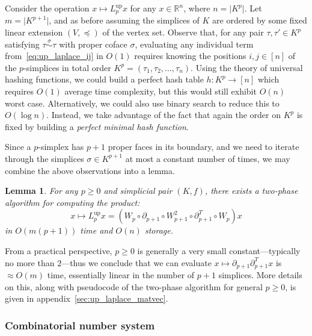 \documentclass[10pt]{article}
\numberwithin{equation}{section}
\newcommand{\+}{%
	\raisebox{0.18ex}{\scaleobj{0.55}{+}}
}
\newtheorem{lemma}{Lemma}
\theoremstyle{definition}
\begin{document}
Consider the operation $x \mapsto L_p^{\text{up}} x$ for any $x \in \mathbb{R}^n$, where $n = \lvert K^p \rvert$. Let $m = \lvert K^{p+1}\rvert$, and as before assuming the simplices of $K$ are ordered by some fixed linear extension $(V, \preceq)$ of the vertex set.
Observe that, for any pair $\tau, \tau' \in K^p$ satisfying $\tau \overset{\sigma}{\sim} \tau$ with proper coface $\sigma$, evaluating any individual term from~\eqref{eq:up_laplace_ij} in $O(1)$ requires knowing the positions $i,j \in [n]$ of the $p$-simplices in total order $K^p = (\tau_1, \tau_2, \dots, \tau_n)$. Using the theory of universal hashing functions, we could build a perfect hash table $h : K^p \to [n]$ which requires $O(1)$ average time complexity, but this would still exhibit $O(n)$ worst case. Alternatively, we could also use binary search to reduce this to $O(\log n)$. Instead, we take advantage of the fact that again the order on $K^p$ is fixed by building a \emph{perfect minimal hash function}. 

Since a $p$-simplex has $p+1$ proper faces in its boundary, and we need to iterate through the simplices $\sigma \in K^{p+1}$ at most a constant number of times, we may combine the above observations into a lemma. 
\begin{lemma}
	For any $p \geq 0$ and simplicial pair $(K, f)$, there exists a two-phase algorithm for computing the product: 
	\begin{equation}
		x \mapsto L_p^{\text{up}} x = (W_p \circ \partial_{p+1} \circ W_{p+1}^2 \circ \partial_{p+1}^T \circ W_p)x
	\end{equation}
	in $O(m(p+1))$ time and $O(n)$ storage. 
\end{lemma}
\noindent From a practical perspective, $p \geq 0$ is generally a very small constant---typically no more than $2$---thus we conclude that we can evaluate $x \mapsto \partial_{p+1} \partial_{p+1}^T x$ is $\approx O(m)$ time, essentially linear in the number of $p+1$ simplices. 
More details on this, along with pseudocode of the two-phase algorithm for general $p \geq 0$, is given in appendix~\ref{sec:up_laplace_matvec}.

\subsubsection{Combinatorial number system}
  
\end{document}
